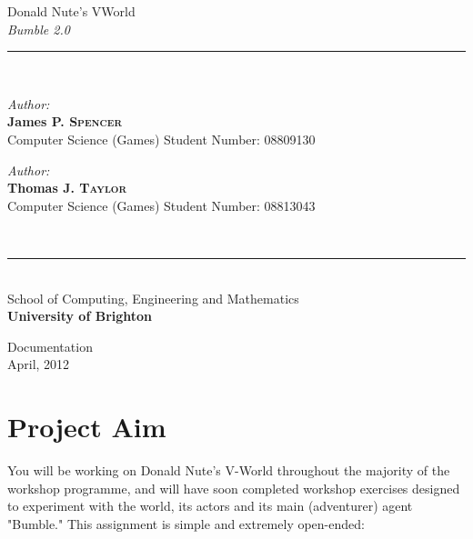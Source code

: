\documentclass[a4paper,oneside]{report}
\newcommand{\HRuleLight}{\rule{\linewidth}{0.1mm}}
\begin{document}
%
%
\begin{titlepage}
\begin{center}

\Huge Donald Nute's VWorld\\ 
\huge \emph{Bumble 2.0}

\HRuleLight\\[0.5cm]

\begin{minipage}{0.45\textwidth}
	\begin{flushleft}\large
		\emph{Author:}\\
			\textbf{James P. \textsc{Spencer}}\\[0.27cm]
			Computer Science (Games)
			Student Number: 08809130
	\end{flushleft}
\end{minipage}
\begin{minipage}{0.45\textwidth}
	\begin{flushright}\large
		\emph{Author:}\\
			\textbf{Thomas J. \textsc{Taylor}}\\[0.27cm]
			Computer Science (Games)
			Student Number: 08813043
	\end{flushright}
\end{minipage}\\[0.75cm] 

\HRuleLight\\[0.2cm]

\large School of Computing, Engineering and Mathematics\\ \textbf{University of Brighton}

\vfill
\huge Documentation\\
\large April, 2012\\

\end{center}
\end{titlepage}

\setcounter{page}{1}


\section{Project Aim}

You will be working on Donald Nute's V-World throughout the majority of the workshop programme, and will have soon completed workshop exercises designed to experiment with the world, its actors and its main (adventurer) agent "Bumble."
This assignment is simple and extremely open-ended:
\end{document}
